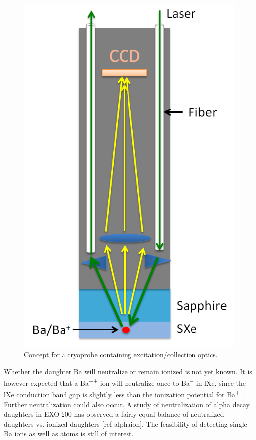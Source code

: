 \begin{figure} %
	\centering
	\includegraphics[width=.5\textwidth]{figures/probe_flat.png}
	\caption{Concept for a cryoprobe containing excitation/collection optics.}
\label{fig:probe}
\end{figure}

Whether the daughter Ba will neutralize or remain ionized is not yet known.  It is however expected that a Ba\textsuperscript{++} ion will neutralize once to Ba\textsuperscript{+} in lXe, since the lXe conduction band gap is slightly less than the ionization potential for Ba\textsuperscript{+} \cite{Moe1991}.  Further neutralization could also occur.  A study of neutralization of alpha decay daughters in EXO-200 has observed a fairly equal balance of neutralized daughters vs. ionized daughters [ref alphaion].  The feasibility of detecting single Ba ions as well as atoms is still of interest.

